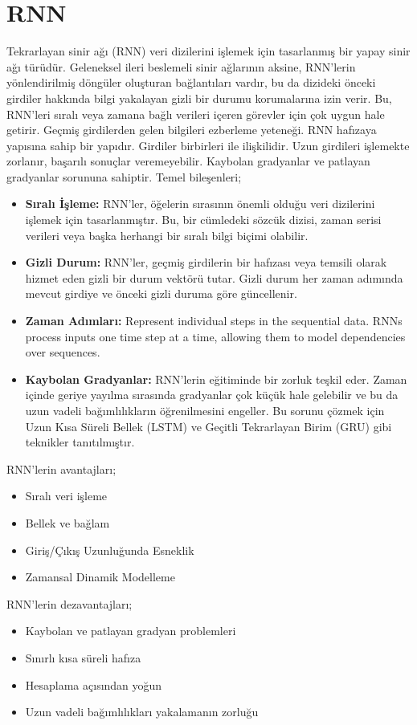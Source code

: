\section{RNN}
Tekrarlayan sinir ağı (RNN) veri dizilerini işlemek için tasarlanmış bir yapay sinir ağı türüdür. Geleneksel ileri beslemeli sinir ağlarının aksine, RNN'lerin yönlendirilmiş döngüler oluşturan bağlantıları vardır, bu da dizideki önceki girdiler hakkında bilgi yakalayan gizli bir durumu korumalarına izin verir. Bu, RNN'leri sıralı veya zamana bağlı verileri içeren görevler için çok uygun hale getirir. Geçmiş girdilerden gelen bilgileri ezberleme yeteneği. RNN hafızaya yapısına sahip bir yapıdır. Girdiler birbirleri ile ilişkilidir. Uzun girdileri işlemekte zorlanır, başarılı sonuçlar veremeyebilir. Kaybolan gradyanlar ve patlayan gradyanlar sorununa sahiptir. Temel bileşenleri;
\begin{itemize}
	\item \textbf{Sıralı İşleme:} RNN'ler, öğelerin sırasının önemli olduğu veri dizilerini işlemek için tasarlanmıştır. Bu, bir cümledeki sözcük dizisi, zaman serisi verileri veya başka herhangi bir sıralı bilgi biçimi olabilir.
	\item \textbf{Gizli Durum:} RNN'ler, geçmiş girdilerin bir hafızası veya temsili olarak hizmet eden gizli bir durum vektörü tutar. Gizli durum her zaman adımında mevcut girdiye ve önceki gizli duruma göre güncellenir.
	\item \textbf{Zaman Adımları:} Represent individual steps in the sequential data. RNNs process inputs one time step at a time, allowing them to model dependencies over sequences.
	\item \textbf{Kaybolan Gradyanlar:} RNN'lerin eğitiminde bir zorluk teşkil eder. Zaman içinde geriye yayılma sırasında gradyanlar çok küçük hale gelebilir ve bu da uzun vadeli bağımlılıkların öğrenilmesini engeller. Bu sorunu çözmek için Uzun Kısa Süreli Bellek (LSTM) ve Geçitli Tekrarlayan Birim (GRU) gibi teknikler tanıtılmıştır.
\end{itemize}

RNN'lerin avantajları;
\begin{itemize}
	\item Sıralı veri işleme
	\item Bellek ve bağlam
	\item Giriş/Çıkış Uzunluğunda Esneklik
	\item Zamansal Dinamik Modelleme
\end{itemize}

RNN'lerin dezavantajları;
\begin{itemize}
	\item Kaybolan ve patlayan gradyan problemleri
	\item Sınırlı kısa süreli hafıza
	\item Hesaplama açısından yoğun
	\item Uzun vadeli bağımlılıkları yakalamanın zorluğu
\end{itemize}

\newpage